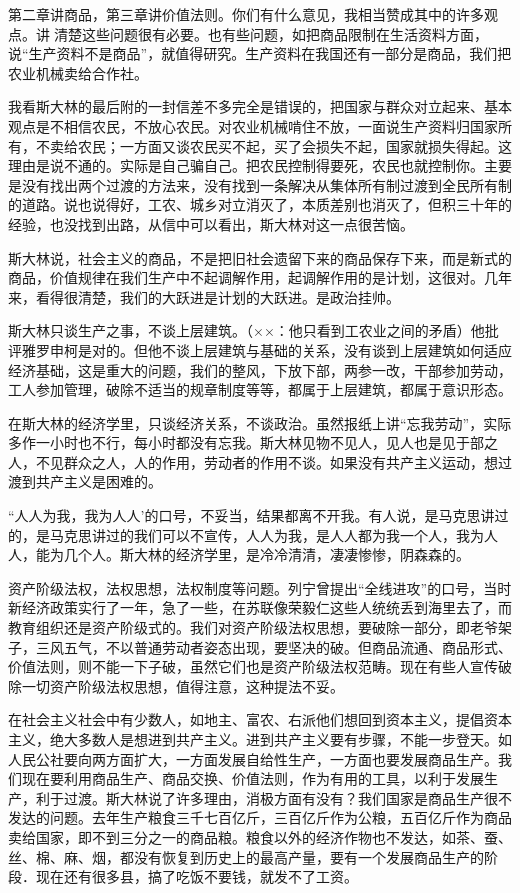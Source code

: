 第二章讲商品，第三章讲价值法则。你们有什么意见，我相当赞成其中的许多观点。讲清楚这些问题很有必要。也有些问题，如把商品限制在生活资料方面，说“生产资料不是商品”，就值得研究。生产资料在我国还有一部分是商品，我们把农业机械卖给合作社。

我看斯大林的最后附的一封信差不多完全是错误的，把国家与群众对立起来、基本观点是不相信农民，不放心农民。对农业机械啃住不放，一面说生产资料归国家所有，不卖给农民；一方面又谈农民买不起，买了会损失不起，国家就损失得起。这理由是说不通的。实际是自己骗自己。把农民控制得要死，农民也就控制你。主要是没有找出两个过渡的方法来，没有找到一条解决从集体所有制过渡到全民所有制的道路。说也说得好，工农、城乡对立消灭了，本质差别也消灭了，但积三十年的经验，也没找到出路，从信中可以看出，斯大林对这一点很苦恼。

斯大林说，社会主义的商品，不是把旧社会遗留下来的商品保存下来，而是新式的商品，价值规律在我们生产中不起调解作用，起调解作用的是计划，这很对。几年来，看得很清楚，我们的大跃进是计划的大跃进。是政治挂帅。

斯大林只谈生产之事，不谈上层建筑。（××：他只看到工农业之间的矛盾）他批评雅罗申柯是对的。但他不谈上层建筑与基础的关系，没有谈到上层建筑如何适应经济基础，这是重大的问题，我们的整风，下放下部，两参一改，干部参加劳动，工人参加管理，破除不适当的规章制度等等，都属于上层建筑，都属于意识形态。

在斯大林的经济学里，只谈经济关系，不谈政治。虽然报纸上讲“忘我劳动”，实际多作一小时也不行，每小时都没有忘我。斯大林见物不见人，见人也是见于部之人，不见群众之人，人的作用，劳动者的作用不谈。如果没有共产主义运动，想过渡到共产主义是困难的。

“人人为我，我为人人’的口号，不妥当，结果都离不开我。有人说，是马克思讲过的，是马克思讲过的我们可以不宣传，人人为我，是人人都为我一个人，我为人人，能为几个人。斯大林的经济学里，是冷冷清清，凄凄惨惨，阴森森的。

资产阶级法权，法权思想，法权制度等问题。列宁曾提出“全线进攻”的口号，当时新经济政策实行了一年，急了一些，在苏联像荣毅仁这些人统统丢到海里去了，而教育组织还是资产阶级式的。我们对资产阶级法权思想，要破除一部分，即老爷架子，三风五气，不以普通劳动者姿态出现，要坚决的破。但商品流通、商品形式、价值法则，则不能一下子破，虽然它们也是资产阶级法权范畴。现在有些人宣传破除一切资产阶级法权思想，值得注意，这种提法不妥。

在社会主义社会中有少数人，如地主、富农、右派他们想回到资本主义，提倡资本主义，绝大多数人是想进到共产主义。进到共产主义要有步骤，不能一步登天。如人民公社要向两方面扩大，一方面发展自给性生产，一方面也要发展商品生产。我们现在要利用商品生产、商品交换、价值法则，作为有用的工具，以利于发展生产，利于过渡。斯大林说了许多理由，消极方面有没有？我们国家是商品生产很不发达的问题。去年生产粮食三千七百亿斤，三百亿斤作为公粮，五百亿斤作为商品卖给国家，即不到三分之一的商品粮。粮食以外的经济作物也不发达，如茶、蚕、丝、棉、麻、烟，都没有恢复到历史上的最高产量，要有一个发展商品生产的阶段．现在还有很多县，搞了吃饭不要钱，就发不了工资。

